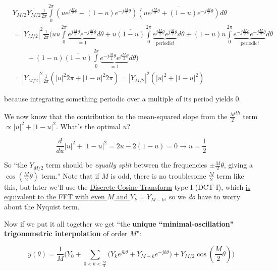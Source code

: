 \documentclass[10pt]{article}
\begin{document}
\begin{align*}
& Y_{M/2}\overline{Y_{M/2}}\frac{1}{2\pi} \int\limits_{0}^{2\pi} (ue^{j\frac{M}{2}\theta} + (1 - u)e^{-j\frac{M}{2}\theta}) \overline{(ue^{j\frac{M}{2}\theta} + (1 - u)e^{-j\frac{M}{2}\theta})} d\theta \\
&= |Y_{M/2}|^2 \frac{1}{2\pi} \Big(u\overline{u} \int\limits_{0}^{2\pi} \underbrace{e^{j\frac{M}{2}\theta} e^{-j\frac{M}{2}\theta}}_{= 1} d\theta + u \overline{(1 - u)} \int\limits_{0}^{2\pi} \underbrace{e^{j\frac{M}{2}\theta} e^{j\frac{M}{2}\theta}}_{\text{periodic!}} d\theta + (1 - u)\overline{u} \int\limits_{0}^{2\pi} \underbrace{e^{-j\frac{M}{2}\theta} e^{-j\frac{M}{2}\theta}}_{\text{periodic!}} d\theta \\
& \quad \quad + (1 - u) \overline{(1 - u)} \int\limits_{0}^{2\pi} \underbrace{e^{-j\frac{M}{2}\theta} e^{j\frac{M}{2}\theta}}_{= 1} d\theta \Big) \\
&= |Y_{M/2}|^2 \frac{1}{2\pi} (|u|^2 2\pi + |1 - u|^2 2\pi) = |Y_{M/2}|^2 (|u|^2 + |1 - u|^2)
\end{align*}

\noindent because integrating something periodic over a multiple of its period yields 0.

We now know that the contribution to the mean-squared slope from the $\frac{M}{2}^{th}$ term $\propto |u|^2 + |1 - u|^2$. What's the optimal $u$?\vspace{-2mm}

$$\frac{d}{du} |u|^2 + |1 - u|^2 = 2u - 2(1-u) = 0 \longrightarrow u = \frac{1}{2}$$

So ``the $Y_{M/2}$ term should be \textit{equally split} between the frequencies $\pm\frac{M}{2}\theta$, giving a $\cos(\frac{M}{2}\theta)$ term." Note that if $M$ is odd, there is no troublesome $\frac{M}{2}$ term like this, but later we'll use the \href{https://docs.scipy.org/doc/scipy/reference/generated/scipy.fft.dct.html}{Discrete Cosine Transform}\cite{dct} type I (DCT-I), which \hyperref[fftdct]{is equivalent to the FFT with even $M$ and $Y_k = Y_{M-k}$}, so we \textit{do} have to worry about the Nyquist term.

Now if we put it all together we get ``the \textbf{unique ``minimal-oscillation" trigonometric interpolation} of order $M$":

\begin{equation}\label{interpolant}
y(\theta) = \frac{1}{M} \Big(Y_0 + \sum_{0 < k < \frac{M}{2}} \big(Y_k e^{j k \theta} + Y_{M-k} e^{-j k \theta}\big) + Y_{M/2}\cos(\frac{M}{2}\theta) \Big)
\end{equation}
\end{document}
